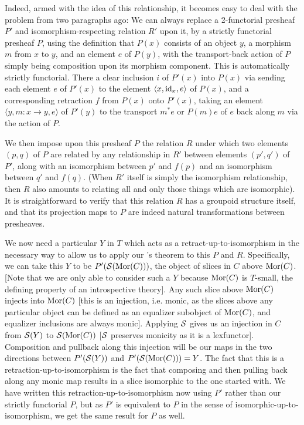 Indeed, armed with the idea of this relationship, it becomes easy to deal with the problem from two paragraphs ago: We can always replace a 2-functorial presheaf $P'$ and isomorphism-respecting relation $R'$ upon it, by a strictly functorial presheaf $P$, using the definition that $P(x)$ consists of an object $y$, a morphism $m$ from $x$ to $y$, and an element $e$ of $P(y)$, with the transport-back action of $P$ simply being composition upon its morphism component. This is automatically strictly functorial. There a clear inclusion $i$ of $P'(x)$ into $P(x)$ via sending each element $e$ of $P'(x)$ to the element $\langle x, \mathrm{id}_x, e \rangle$ of $P(x)$, and a corresponding retraction $f$ from $P(x)$ onto $P'(x)$, taking an element $\langle y, m : x \to y, e \rangle$ of $P'(y)$ to the transport $m^* e$ or $P(m) e$ of $e$ back along $m$ via the action of $P$.

We then impose upon this presheaf $P$ the relation $R$ under which two elements $(p, q)$ of $P$ are related by any relationship in $R'$ between elements $(p', q')$ of $P'$, along with an isomorphism between $p'$ and $f(p)$ and an isomorphism between $q'$ and $f(q)$. (When $R'$ itself is simply the isomorphism relationship, then $R$ also amounts to relating all and only those things which are isomorphic). It is straightforward to verify that this relation $R$ has a groupoid structure itself, and that its projection maps to $P$ are indeed natural transformations between presheaves. 

We now need a particular $Y$ in $T$ which acts as a retract-up-to-isomorphism in the necessary way to allow us to apply our \Loeb's theorem to this $P$ and $R$. Specifically, we can take this $Y$ to be $P'(\mathcal{S}(\operatorname{Mor}(C)))$, the object of slices in $C$ above $\operatorname{Mor}(C)$. [Note that we are only able to consider such a $Y$ because $\operatorname{Mor}(C)$ is $T$-small, the defining property of an introspective theory]. Any such slice above $\operatorname{Mor}(C)$ injects into $\operatorname{Mor}(C)$ [this is an injection, i.e. monic, as the slices above any particular object can be defined as an equalizer subobject of $\operatorname{Mor}(C)$, and equalizer inclusions are always monic]. Applying $\mathcal{S}$ gives us an injection in $C$ from $\mathcal{S}(Y)$ to $\mathcal{S}(\operatorname{Mor}(C))$ [$\mathcal{S}$ preserves monicity as it is a lexfunctor]. Composition and pullback along this injection will be our maps in the two directions between $P'(\mathcal{S}(Y))$ and $P'(\mathcal{S}(\operatorname{Mor}(C))) = Y$. The fact that this is a retraction-up-to-isomorphism is the fact that composing and then pulling back along any monic map results in a slice isomorphic to the one started with. We have written this retraction-up-to-isomorphism now using $P'$ rather than our strictly functorial $P$, but as $P'$ is equivalent to $P$ in the sense of isomorphic-up-to-isomorphism, we get the same result for $P$ as well. 

